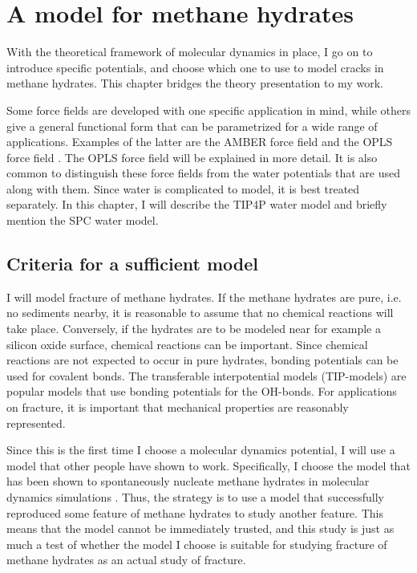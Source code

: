 \chapter{A model for methane hydrates}
\label{ch:models}
With the theoretical framework of molecular dynamics in place, I go on to introduce specific potentials, and choose which one to use to model cracks in methane hydrates. This chapter bridges the theory presentation to my work. 

Some force fields are developed with one specific application in mind, while others give a general functional form that can be parametrized for a wide range of applications. Examples of the latter are the AMBER force field \cite{Cornell1995} and the OPLS force field \cite{Jorgensen1988}. The OPLS force field will be explained in more detail. It is also common to distinguish these force fields from the water potentials that are used along with them. Since water is complicated to model, it is best treated separately. In this chapter, I will describe the TIP4P water model and briefly mention the SPC water model.

\section{Criteria for a sufficient model}
I will model fracture of methane hydrates. If the methane hydrates are pure, i.e. no sediments nearby, it is reasonable to assume that no chemical reactions will take place. Conversely, if the hydrates are to be modeled near for example a silicon oxide surface, chemical reactions can be important. Since chemical reactions are not expected to occur in pure hydrates, bonding potentials can be used for covalent bonds. The transferable interpotential models (TIP-models) are popular models that use bonding potentials for the OH-bonds. For applications on fracture, it is important that mechanical properties are reasonably represented. 

Since this is the first time I choose a molecular dynamics potential, I will use a model that other people have shown to work. Specifically, I choose the model that has been shown to spontaneously nucleate methane hydrates in molecular dynamics simulations \cite{Walsh2009}. Thus, the strategy is to use a model that successfully reproduced some feature of methane hydrates to study another feature. This means that the model cannot be immediately trusted, and this study is just as much a test of whether the model I choose is suitable for studying fracture of methane hydrates as an actual study of fracture.

